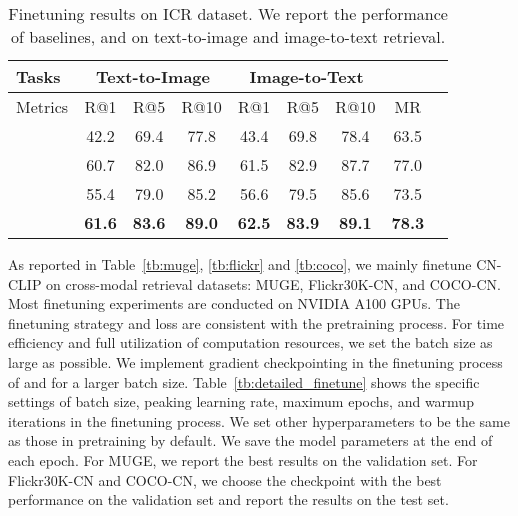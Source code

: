 \documentclass[11pt]{article}
\begin{document}
%
 \begin{table*}[t]
\center
\small
\begin{adjustbox}{max width=1.\textwidth}
\begin{tabular}{@{\extracolsep{\fill}}lcccccccc}
\toprule
  Tasks
  &\multicolumn{3}{c}{Text-to-Image}
  &\multicolumn{3}{c}{Image-to-Text}
  & 
  \\
\midrule
  Metrics & R@1 & R@5 & R@10 & R@1 & R@5 & R@10 & MR
  \\
\midrule
  
  & 42.2    & 69.4  & 77.8	& 43.4	& 69.8	& 78.4 & 63.5
  \\
  
  & 60.7    & 82.0  & 86.9  & 61.5  & 82.9  & 87.7  & 77.0
  \\
  
  & 55.4    & 79.0  & 85.2  & 56.6  & 79.5  & 85.6  & 73.5
  \\
  
  & \textbf{61.6}    & \textbf{83.6}  & \textbf{89.0}  & \textbf{62.5}  & \textbf{83.9}  & \textbf{89.1}  & \textbf{78.3}
  \\

\bottomrule
\end{tabular}
\end{adjustbox}
\caption{Finetuning results on ICR dataset. We report the performance of baselines,  and  on text-to-image and image-to-text retrieval. }
\label{tb:ICR}
\end{table*} As reported in Table~\ref{tb:muge}, \ref{tb:flickr} and \ref{tb:coco}, we mainly finetune CN-CLIP on  cross-modal retrieval datasets: MUGE, Flickr30K-CN, and COCO-CN.
Most finetuning experiments are conducted on  NVIDIA A100 GPUs.
The finetuning strategy and loss are consistent with the pretraining process.
For time efficiency and full utilization of computation resources, we set the batch size as large as possible.
We implement gradient checkpointing in the finetuning process of  and  for a larger batch size.
Table~\ref{tb:detailed_finetune} shows the specific settings of batch size, peaking learning rate, maximum epochs, and warmup iterations in the finetuning process.
We set other hyperparameters to be the same as those in pretraining by default.
We save the model parameters at the end of each epoch.
For MUGE, we report the best results on the validation set.
For Flickr30K-CN and COCO-CN, we choose the checkpoint with the best performance on the validation set and report the results on the test set.
\end{document}
